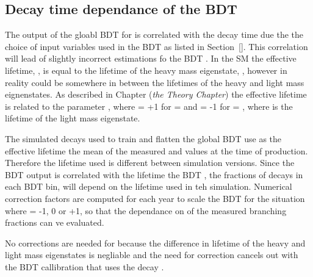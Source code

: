 \subsection{Decay time dependance of the \bsmumu BDT \pdf}
\label{sec:ADGBDTcorrections}
The output of the gloabl BDT for \bmumu is correlated with the \bmumu decay time due the the choice of input variables used in the BDT as listed in Section~\ref{}. This correlation will lead of slightly incorrect estimations fo the \bsmumu BDT \pdf. In the SM the \bsmumu effective lifetime, \tmumu, is equal to the lifetime of the heavy \bs mass eigenstate, \tH, however in reality \tmumu could be somewhere in between the lifetimes of the heavy and light mass eignenstates. As described in Chapter ({\it the Theory Chapter}) the \bsmumu effective lifetime is related to the parameter \ADG, where \ADG = +1 for \tmumu = \tH and \ADG = -1 for \tmumu = \tL, where \tL is the lifetime of the light \bsmumu mass eigenstate.

The simulated decays used to train and flatten the global BDT use as the \bsmumu effective lifetime the mean of the measured \tH and \tL values at the time of production. Therefore the lifetime used is different between simulation versions. Since the BDT output is correlated with the lifetime the BDT \pdf, the fractions of \bsmumu decays in each BDT bin, will depend on the lifetime used in teh simulation. Numerical correction factors are computed for each year to scale the BDT \pdf for the situation where \ADF = -1, 0 or +1, so that the dependance on \ADG of the measured branching fractions can ve evaluated.

No corrections are needed for \bdmumu because the difference in lifetime of the heavy and light \bd mass eigenstates  is negliable and the need for correction cancels out with the BDT callibration that uses the \bd decay \bdkpi. 


